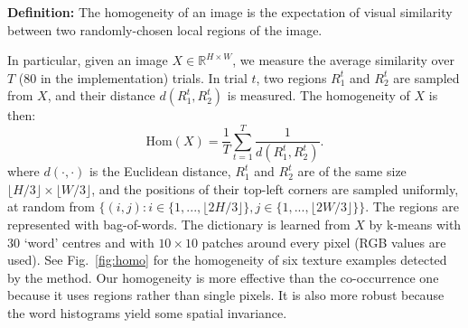 \documentclass[10pt,twocolumn,letterpaper]{article}
\begin{document}
\noindent 
\textbf{Definition:} The homogeneity of an image is the expectation of
visual similarity between two randomly-chosen local regions of the image.

In particular, given an image $X \in \mathbb{R}^{H\times W}$, we
measure the average similarity over $T$ ($80$ in the implementation)
trials.  In trial $t$, two regions $R_1^t$ and $R_2^t$ are sampled
from $X$, and their distance $d(R_1^t, R_2^t)$ is measured. The
homogeneity of $X$ is then:
\begin{equation}
  \label{eq:repet}
\text{Hom}(X) = \frac{1}{T}\sum_{t=1}^T \frac{1}{d(R_1^t, R_2^t)}.  
\end{equation}
where $d(\cdot, \cdot)$ is the Euclidean distance, $R_1^t$ and $R_2^t$
are of the same size $\lfloor H/3 \rfloor \times \lfloor W/3 \rfloor$,
and the positions of their top-left corners are sampled uniformly, at
random from $\{(i,j): i\in\{1, ..., \lfloor 2H/3 \rfloor \}, j\in \{1,
..., \lfloor 2W/3 \rfloor \} \}$.  The regions are represented with
bag-of-words. The dictionary is learned from $X$ by k-means with $30$
`word' centres and with $10\times 10$ patches around every pixel (RGB
values are used). See Fig.~\ref{fig:homo} for the homogeneity of six
texture examples detected by the method.  Our homogeneity is more
effective than the co-occurrence one ~\cite{texture:analysis} because
it uses regions rather than single pixels. It is also more robust
because the word histograms yield some spatial invariance. 
 
\end{document}
